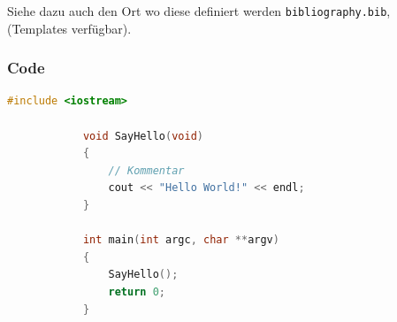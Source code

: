         Siehe dazu auch den Ort wo diese definiert werden \verb|bibliography.bib|, (Templates verfügbar).

        \subsubsection{Code}
        \begin{lstlisting}[language=C++,name={1. Beispiel},label={sc:bsp:1}]
            #include <iostream>

            void SayHello(void)
            {
                // Kommentar
                cout << "Hello World!" << endl;
            }

            int main(int argc, char **argv)
            {
                SayHello();
                return 0;
            }
            \end{lstlisting}

\clearpage